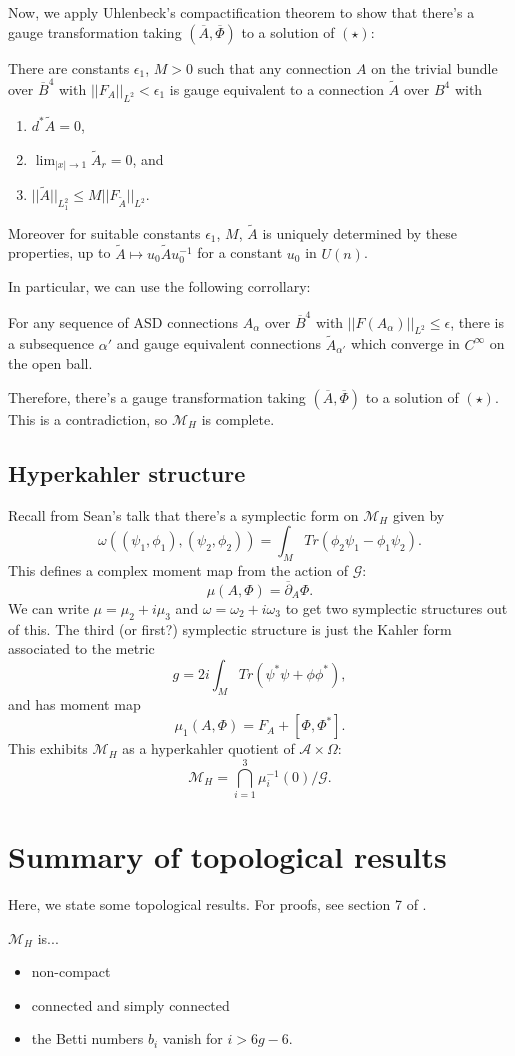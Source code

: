Now, we apply Uhlenbeck's compactification theorem to show that there's
a gauge transformation taking $\left(\overline{A},\overline{\Phi}\right)$
to a solution of $(\star)$:
\begin{thm}
[Uhlenbeck] There are constants $\epsilon_{1}$, $M>0$ such that
any connection $A$ on the trivial bundle over $\overline{B}^{4}$
with $||F_{A}||_{L^{2}}<\epsilon_{1}$ is gauge equivalent to a connection
$\tilde{A}$ over $B^{4}$ with
\begin{enumerate}
\item $d^{*}\tilde{A}=0$,
\item $\lim_{\left|x\right|\rightarrow1}\tilde{A}_{r}=0$, and
\item $||\tilde{A}||_{L_{1}^{2}}\leq M||F_{\tilde{A}}||_{L^{2}}$.
\end{enumerate}
Moreover for suitable constants $\epsilon_{1}$, $M$, $\tilde{A}$
is uniquely determined by these properties, up to $\tilde{A}\mapsto u_{0}\tilde{A}u_{0}^{-1}$
for a constant $u_{0}$ in $U\left(n\right)$.
\end{thm}
In particular, we can use the following corrollary:
\begin{cor*}
For any sequence of ASD connections $A_{\alpha}$ over $\overline{B}^{4}$
with $||F\left(A_{\alpha}\right)||_{L^{2}}\leq\epsilon$, there is
a subsequence $\alpha'$ and gauge equivalent connections $\tilde{A}_{\alpha'}$
which converge in $C^{\infty}$ on the open ball.
\end{cor*}
Therefore, there's a gauge transformation taking $\left(\overline{A},\overline{\Phi}\right)$
to a solution of $(\star)$. This is a contradiction, so $\mathcal{M}_{H}$
is complete.


\subsection{Hyperkahler structure}

Recall from Sean's talk that there's a symplectic form on $\mathcal{M}_{H}$
given by
\[
\omega\left((\psi_{1},\phi_{1}),\left(\psi_{2},\phi_{2}\right)\right)=\int_{M}Tr\left(\phi_{2}\psi_{1}-\phi_{1}\psi_{2}\right).
\]
This defines a complex moment map from the action of $\mathcal{G}$:
\[
\mu\left(A,\Phi\right)=\overline{\partial}_{A}\Phi.
\]
We can write $\mu=\mu_{2}+i\mu_{3}$ and $\omega=\omega_{2}+i\omega_{3}$
to get two symplectic structures out of this. The third (or first?)
symplectic structure is just the Kahler form associated to the metric
\[
g=2i\int_{M}Tr\left(\psi^{*}\psi+\phi\phi^{*}\right),
\]
and has moment map
\[
\mu_{1}\left(A,\Phi\right)=F_{A}+\left[\Phi,\Phi^{*}\right].
\]
This exhibits $\mathcal{M}_{H}$ as a hyperkahler quotient of $\mathcal{A}\times\Omega$:
\[
\mathcal{M}_{H}=\bigcap_{i=1}^{3}\mu_{i}^{-1}\left(0\right)/\mathcal{G}.
\]



\section{Summary of topological results}

Here, we state some topological results. For proofs, see section 7
of \cite{H1}.

$\mathcal{M}_{H}$ is...
\begin{itemize}
\item non-compact
\item connected and simply connected
\item the Betti numbers $b_{i}$ vanish for $i>6g-6.$
\end{itemize}